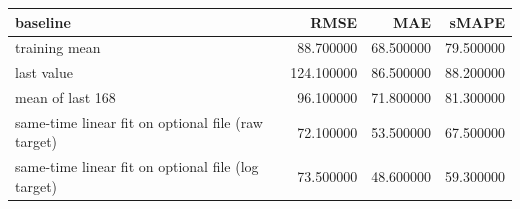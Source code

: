 \begin{tabular}{lrrr}
\toprule
baseline & RMSE & MAE & sMAPE \\
\midrule
training mean & 88.700000 & 68.500000 & 79.500000 \\
last value & 124.100000 & 86.500000 & 88.200000 \\
mean of last 168 & 96.100000 & 71.800000 & 81.300000 \\
same-time linear fit on optional file (raw target) & 72.100000 & 53.500000 & 67.500000 \\
same-time linear fit on optional file (log target) & 73.500000 & 48.600000 & 59.300000 \\
\bottomrule
\end{tabular}
